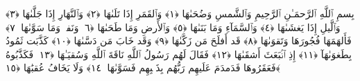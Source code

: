 
  
    
  
    
    

\nopagebreak
  بِسمِ ٱللَّهِ ٱلرَّحمَـٰنِ ٱلرَّحِيمِ
  وَٱلشَّمسِ وَضُحَىٰهَا ﴿١﴾
 وَٱلقَمَرِ إِذَا تَلَىٰهَا ﴿٢﴾
 وَٱلنَّهَارِ إِذَا جَلَّىٰهَا ﴿٣﴾
 وَٱلَّيلِ إِذَا يَغشَىٰهَا ﴿٤﴾
 وَٱلسَّمَآءِ وَمَا بَنَىٰهَا ﴿٥﴾
 وَٱلأَرضِ وَمَا طَحَىٰهَا ﴿٦﴾
 وَنَفسٍۢ وَمَا سَوَّىٰهَا ﴿٧﴾
 فَأَلهَمَهَا فُجُورَهَا وَتَقوَىٰهَا ﴿٨﴾
 قَد أَفلَحَ مَن زَكَّىٰهَا ﴿٩﴾
 وَقَد خَابَ مَن دَسَّىٰهَا ﴿١٠﴾
 كَذَّبَت ثَمُودُ بِطَغوَىٰهَآ ﴿١١﴾
 إِذِ ٱنۢبَعَثَ أَشقَىٰهَا ﴿١٢﴾
 فَقَالَ لَهُم رَسُولُ ٱللَّهِ نَاقَةَ ٱللَّهِ وَسُقيَـٰهَا ﴿١٣﴾
 فَكَذَّبُوهُ فَعَقَرُوهَا فَدَمدَمَ عَلَيهِم رَبُّهُم بِذَنۢبِهِم فَسَوَّىٰهَا ﴿١٤﴾
 وَلَا يَخَافُ عُقبَٰهَا ﴿١٥﴾
 
